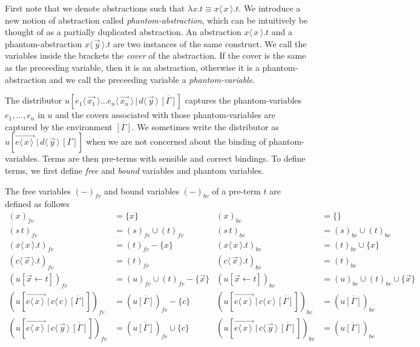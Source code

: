 \documentclass[a4paper,UKenglish,cleveref, autoref]{lipics-v2019}
\newcommand{\fv}[1]{(#1)_{fv}}
\newcommand{\bv}[1]{(#1)_{bv}}
\newcommand{\set}[1]{ \{ #1 \} }
\newcommand{\abs}[2]{\lambda #1 . #2}
\newcommand{\app}[2]{#1 \, #2}
\newcommand{\fake}[3]{#1 \langle \, #2 \, \rangle . #3}
\newcommand{\share}[3]{#1 [#2 \leftarrow #3]}
\newcommand{\dist}[5]{#1 [ #2 \, \vert \, \fakedist{#4}{#5} \, #3 ]}
\newcommand{\fakedist}[2]{#1 \langle \, #2 \, \rangle}
\newcommand{\vecdist}[2]{\overrightarrow{\fakedist{#1}{#2} \,}}
\begin{document}
First note that we denote abstractions such that $\abs{x}{t} \equiv \fake{x}{x}{t}$. We introduce a new notion of abstraction called \emph{phantom-abstraction}, which can be intuitively be thought of as a partially duplicated abstraction. An abstraction $\fake{x}{x}{t}$ and a phantom-abstraction $\fake{x}{\vec{y}}{t}$ are two instances of the same construct. We call the variables inside the brackets the \emph{cover} of the abstraction. If the cover is the same as the preceeding variable, then it is an abstraction, otherwise it is a phantom-abstraction and we call the preceeding variable a \emph{phantom-variable}.

The distributor $\dist{u}{\fakedist{e_{1}}{\vec{x_{1}}} \dots \fakedist{e_{n}}{\vec{x_{n}}}}{\overline{[\Gamma]}}{d}{\vec{y}}$ captures the phantom-variables $e_{1}, \dots, e_{n}$ in $u$ and the covers associated with those phantom-variables are captured by the environment $\overline{[\Gamma]}$. We sometimes write the distributor as $\dist{u}{\vecdist{e}{x}}{\overline{[\Gamma]}}{d}{\vec{y}}$ when we are not concerned about the binding of phantom-variables. Terms are then pre-terms with sensible and correct bindings. To define terms, we first define \emph{free} and \emph{bound} variables and phantom variables.

\begin{definition}
\label{def:freeboundvar} The free variables $\fv{-}$ and bound variables $\bv{-}$ of a pre-term $t$ are defined as follows
\begingroup
\allowdisplaybreaks
	\begin{align*}
		\fv{x} &= \set{x} & \bv{x} &= \set{} \\
		\fv{\app{s}{t}} &= \fv{s} \cup \fv{t} & \bv{\app{s}{t}} &= \bv{s} \cup \bv{t} \\
		\fv{\fake{x}{x}{t}} &= \fv{t} - \set{x} & \bv{\fake{x}{x}{t}} &= \bv{t} \cup \set{x} \\
		\fv{\fake{c}{\vec{x}}{t}} &= \fv{t} & \bv{\fake{c}{\vec{x}}{t}} &= \bv{t} \\
		\fv{\share{u}{\vec{x}}{t}} &= \fv{u} \cup \fv{t} - \set{\vec{x}} & \bv{\share{u}{\vec{x}}{t}} &= \bv{u} \cup \bv{t} \cup \set{\vec{x}}  \\
		\fv{\dist{u}{\vecdist{e}{x}}{\overline{[\Gamma]}}{c}{c}} &= \fv{u \overline{[\Gamma]}} - \set{c} & \bv{\dist{u}{\vecdist{e}{x}}{\overline{[\Gamma]}}{c}{c}} &= \bv{u \overline{[\Gamma]}} \\
		\fv{\dist{u}{\vecdist{e}{x}}{\overline{[\Gamma]}}{c}{\vec{y}}} &= \fv{u \overline{[\Gamma]}} \cup \set{c} & \bv{\dist{u}{\vecdist{e}{x}}{\overline{[\Gamma]}}{c}{\vec{y}}} &= \bv{u \overline{[\Gamma]}} \\
	\end{align*}
\endgroup
\end{definition}
\end{document}
